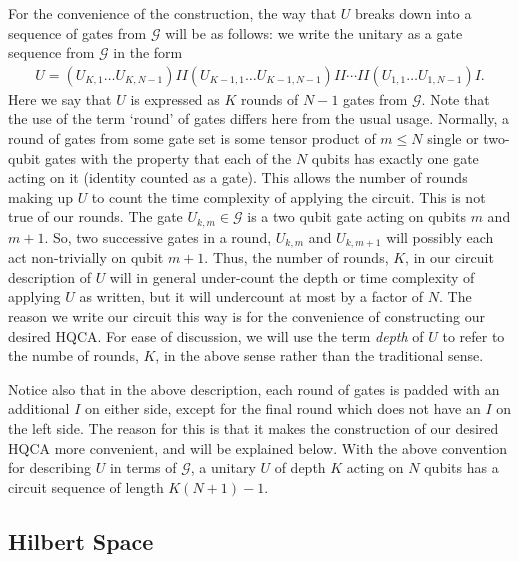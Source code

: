 \documentclass[11pt,letterpaper]{article}
\newcommand{\<}{\langle}
\renewcommand{\>}{\rangle}
\begin{document}
For the convenience of the construction, the way that $U$ breaks down into a sequence of gates from $\mathcal{G}$ will be as follows: we write the unitary as a gate sequence from $\mathcal{G}$ in the form
\begin{eqnarray}
	U = (U_{K,1}\dots U_{K,N-1})II(U_{K-1,1}\dots U_{K-1,N-1})II \cdots II(U_{1,1}\dots U_{1,N-1})I.
	\label{circuitsequence}
\end{eqnarray}
Here we say that $U$ is expressed as $K$ rounds of $N-1$ gates from $\mathcal{G}$. Note that the use of the term `round' of gates differs here from the usual usage. Normally, a round of gates from some gate set is some tensor product of $m\leq N$ single or two-qubit gates with the property that each of the $N$ qubits has exactly one gate acting on it (identity counted as a gate). This allows the number of rounds making up $U$ to count the time complexity of applying the circuit. This is not true of our rounds. The gate $U_{k,m}\in\mathcal{G}$ is a two qubit gate acting on qubits $m$ and $m+1$. So, two successive gates in a round, $U_{k,m}$ and $U_{k,m+1}$ will possibly each act non-trivially on qubit $m+1$. Thus, the number of rounds, $K$, in our circuit description of $U$ will in general under-count the depth or time complexity of applying $U$ as written, but it will undercount at most by a factor of $N$. The reason we write our circuit this way is for the convenience of constructing our desired HQCA. For ease of discussion, we will use the term \emph{depth} of $U$ to refer to the numbe of rounds, $K$, in the above sense rather than the traditional sense.

Notice also that in the above description, each round of gates is padded with an additional $I$ on either side, except for the final round which does not have an $I$ on the left side. The reason for this is that it makes the construction of our desired HQCA more convenient, and will be explained below. With the above convention for describing $U$ in terms of $\mathcal{G}$, a unitary $U$ of depth $K$ acting on $N$ qubits has a circuit sequence of length $K(N+1)-1$.

\subsection{Hilbert Space}
\end{document}
